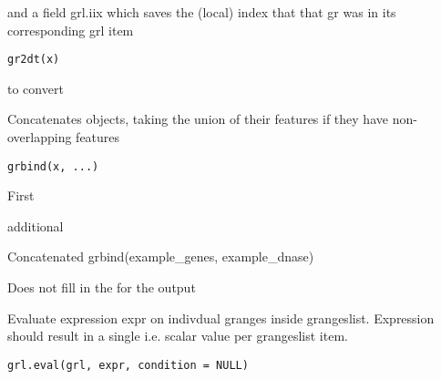 \documentclass[a4paper]{book}
\begin{document}
%
\begin{Description}\relax
and a field grl.iix which saves the (local) index that that gr was in its corresponding grl item
\end{Description}
%
\begin{Usage}
\begin{verbatim}
gr2dt(x)
\end{verbatim}
\end{Usage}
%
\begin{Arguments}
\begin{ldescription}
\item[\code{x}]  to convert
\end{ldescription}
\end{Arguments}
%
\begin{Description}\relax
Concatenates  objects, taking the union of their features if they have non-overlapping features
\end{Description}
%
\begin{Usage}
\begin{verbatim}
grbind(x, ...)
\end{verbatim}
\end{Usage}
%
\begin{Arguments}
\begin{ldescription}
\item[\code{x}] First 

\item[\code{...}] additional 
\end{ldescription}
\end{Arguments}
%
\begin{Value}
Concatenated 
grbind(example\_genes, example\_dnase)
\end{Value}
%
\begin{Note}\relax
Does not fill in the  for the output 
\end{Note}
%
\begin{Description}\relax
Evaluate expression expr on indivdual granges inside grangeslist.
Expression should result in a single i.e. scalar value per grangeslist item.
\end{Description}
%
\begin{Usage}
\begin{verbatim}
grl.eval(grl, expr, condition = NULL)
\end{verbatim}
\end{Usage}
\end{document}
